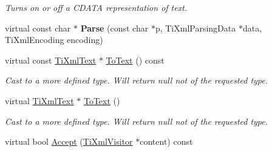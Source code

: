 \begin{DoxyCompactItemize}
\begin{DoxyCompactList}\small\item\em Turns on or off a CDATA representation of text. \item\end{DoxyCompactList}\item 
\hypertarget{class_ti_xml_text_abb3e10deb3391772b902247e8d75331f}{
virtual const char $\ast$ {\bfseries Parse} (const char $\ast$p, TiXmlParsingData $\ast$data, TiXmlEncoding encoding)}
\label{class_ti_xml_text_abb3e10deb3391772b902247e8d75331f}

\item 
\hypertarget{class_ti_xml_text_a895bf34ffad17f7439ab2a52b9651648}{
virtual const \hyperlink{class_ti_xml_text}{TiXmlText} $\ast$ \hyperlink{class_ti_xml_text_a895bf34ffad17f7439ab2a52b9651648}{ToText} () const }
\label{class_ti_xml_text_a895bf34ffad17f7439ab2a52b9651648}

\begin{DoxyCompactList}\small\item\em Cast to a more defined type. Will return null not of the requested type. \item\end{DoxyCompactList}\item 
\hypertarget{class_ti_xml_text_ae7c3a8fd3e4dbf6c0c4363a943d72f5b}{
virtual \hyperlink{class_ti_xml_text}{TiXmlText} $\ast$ \hyperlink{class_ti_xml_text_ae7c3a8fd3e4dbf6c0c4363a943d72f5b}{ToText} ()}
\label{class_ti_xml_text_ae7c3a8fd3e4dbf6c0c4363a943d72f5b}

\begin{DoxyCompactList}\small\item\em Cast to a more defined type. Will return null not of the requested type. \item\end{DoxyCompactList}\item 
virtual bool \hyperlink{class_ti_xml_text_a8483d4415ce9de6c4fa8f63d067d5de6}{Accept} (\hyperlink{class_ti_xml_visitor}{TiXmlVisitor} $\ast$content) const 
\end{DoxyCompactItemize}
